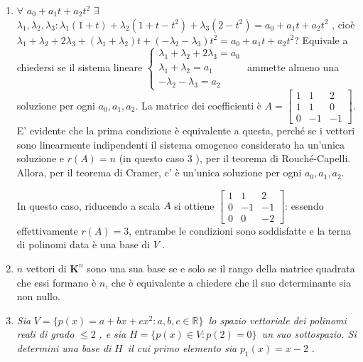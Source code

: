 \documentclass{article}
\begin{document}
\begin{enumerate}
\begin{enumerate}
\item $\forall $ $a_{0}+a_{1}t+a_{2}t^{2}$ $\exists $ $\lambda _{1},\lambda
_{2},\lambda _{3}:\lambda _{1}\left( 1+t\right) +\lambda _{2}\left(
1+t-t^{2}\right) +\lambda _{3}\left( 2-t^{2}\right) =a_{0}+a_{1}t+a_{2}t^{2}$%
, cio\`{e} $\lambda _{1}+\lambda _{2}+2\lambda _{3}+\left( \lambda
_{1}+\lambda _{2}\right) t+\left( -\lambda _{2}-\lambda _{3}\right)
t^{2}=a_{0}+a_{1}t+a_{2}t^{2}$? Equivale a chiedersi se il sistema lineare $%
\left\{ 
\begin{array}{c}
\lambda _{1}+\lambda _{2}+2\lambda _{3}=a_{0} \\ 
\lambda _{1}+\lambda _{2}=a_{1} \\ 
-\lambda _{2}-\lambda _{3}=a_{2}%
\end{array}%
\right. $ ammette almeno una soluzione per ogni $a_{0},a_{1},a_{2}$. La
matrice dei coefficienti \`{e} $A=\left[ 
\begin{array}{ccc}
1 & 1 & 2 \\ 
1 & 1 & 0 \\ 
0 & -1 & -1%
\end{array}%
\right] $. E' evidente che la prima condizione \`{e} equivalente a questa,
perch\'{e} se i vettori sono linearmente indipendenti il sistema omogeneo
considerato ha un'unica soluzione e $r\left( A\right) =n$ (in questo caso $3$%
), per il teorema di Rouch\'{e}-Capelli. Allora, per il teorema di Cramer, c'%
\`{e} un'unica soluzione per ogni $a_{0},a_{1},a_{2}$.

In questo caso, riducendo a scala $A$ si ottiene $\left[ 
\begin{array}{ccc}
1 & 1 & 2 \\ 
0 & -1 & -1 \\ 
0 & 0 & -2%
\end{array}%
\right] $: essendo effettivamente $r\left( A\right) =3$, entrambe le
condizioni sono soddisfatte e la terna di polinomi data \`{e} una base di $V$%
.

\item $n$ vettori di $\mathbf{K}^{n}$ sono una sua base se e solo se il
rango della matrice quadrata che essi formano \`{e} $n$, che \`{e}
equivalente a chiedere che il suo determinante sia non nullo.

\item \textit{Sia }$V=\{p(x)=a+bx+cx^{2}:a,b,c\in 
\mathbb{R}
\}$\textit{\ lo spazio vettoriale dei polinomi reali di grado }$\leq 2$%
\textit{, e sia }$H=\{p(x)\in V:p(2)=0\}$\textit{\ un suo sottospazio. Si
determini una base di }$H$\textit{\ il cui primo elemento sia }$p_{1}(x)=x-2$%
\textit{.}


\end{enumerate}
\end{enumerate}
\end{document}
